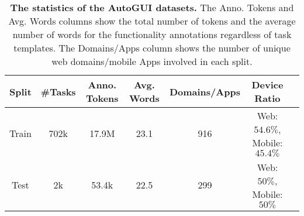 
\begin{table}[]
\centering
\small
\caption{\textbf{The statistics of the AutoGUI datasets.} The Anno. Tokens and Avg. Words columns show the total number of tokens and the average number of words for the functionality annotations regardless of task templates. The Domains/Apps column shows the number of unique web domains/mobile Apps involved in each split.}
\label{tab:simple data stats}
\begin{tabular}{@{}ccccccc@{}}
\toprule
Split & \#Tasks & Anno. Tokens & Avg. Words & Domains/Apps & Device Ratio   \\                                                                   \midrule
Train & 702k  & 17.9M        & 23.1       & 916     & Web: $54.6\%$, Mobile: $45.4\%$                                              \\ \cmidrule(r){1-6}
Test  & 2k    & 53.4k        & 22.5       & 299     & Web: $50\%$, Mobile: $50\%$                                                                                                               \\ \bottomrule
\end{tabular}
\end{table}